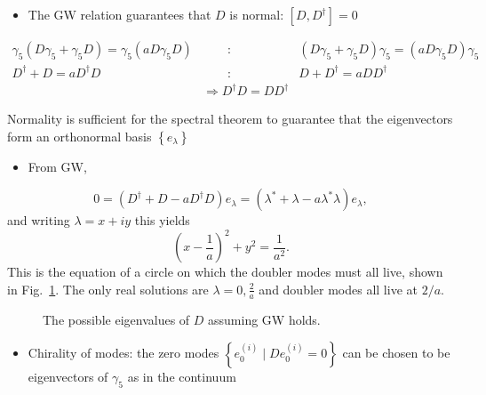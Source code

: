 \begin{itemize}
  \item The GW relation guarantees that \(D\) is normal: \(\left[D, D^{\dagger}\right]=0\)
\end{itemize}

\begin{equation}
\begin{array}{rcl}
\gamma_{5}\left(D\gamma_5+\gamma_{5} D\right)=\gamma_{5}\left(a D{\gamma_{5}} D\right) & \qquad : \qquad & \left(D{\gamma_{5}}+\gamma_{5} D\right) \gamma_{5}=\left(a D{\gamma_{5}} D\right){\gamma_{5}} \\
D^{\dagger}+D=a D^{\dagger} D &\qquad  : \qquad & D+D^{\dagger}=a D D^{\dagger} \\
& \Rightarrow D^{\dagger} D=D D^{\dagger} &
\end{array}
\end{equation}

Normality is sufficient for the spectral theorem to guarantee that the eigenvectors form an orthonormal basis \(\left\{e_{\lambda}\right\}\)

\begin{itemize}
  \item From GW,
\end{itemize}
\begin{equation}
    0 = (D^\dagger + D - a D^\dagger D) e_\lambda = (\lambda^* + \lambda - a \lambda^* \lambda)e_\lambda,
\end{equation}
and writing $\lambda = x+iy$ this yields
\begin{equation}
    \left(x-\frac{1}{a}\right)^2 + y^2 = \frac{1}{a^2}.
\end{equation}
This is the equation of a circle on which the doubler modes must all live, shown in Fig.~\ref{fig:doubler_circle}. The only real solutions are $\lambda = 0, \frac{2}{a}$ and doubler modes all live at $2/a$.
\begin{figure}
    \centering
    \caption{The possible eigenvalues of $D$ assuming GW holds.}
    \label{fig:doubler_circle}
\end{figure}

\begin{itemize}
  \item Chirality of modes: the zero modes \(\left\{e_{0}^{(i)} \mid D e_{0}^{(i)}=0\right\}\) can be chosen to be eigenvectors of \(\gamma_5\) as in the continuum
\end{itemize}

